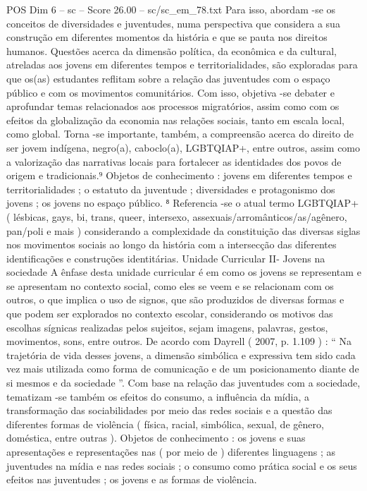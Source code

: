 \begin{textsample}{POS Dim 6 – sc – Score 26.00 – sc/sc\_em\_78.txt}
Para isso, abordam -se os conceitos de diversidades e juventudes, numa perspectiva que considera a sua construção em diferentes momentos da história e que se pauta nos direitos humanos.
Questões acerca da dimensão política, da econômica e da cultural, atreladas aos jovens em diferentes tempos e territorialidades, são exploradas para que os(as) estudantes reflitam sobre a relação das juventudes com o espaço público e com os movimentos comunitários.
Com isso, objetiva -se debater e aprofundar temas relacionados aos processos migratórios, assim como com os efeitos da globalização da economia nas relações sociais, tanto em escala local, como global.
Torna -se importante, também, a compreensão acerca do direito de ser jovem indígena, negro(a), caboclo(a), LGBTQIAP+, entre outros, assim como a valorização das narrativas locais para fortalecer as identidades dos povos de origem e tradicionais.⁹ Objetos de conhecimento : jovens em diferentes tempos e territorialidades ; o estatuto da juventude ; diversidades e protagonismo dos jovens ; os jovens no espaço público. ⁸ Referencia -se o atual termo LGBTQIAP+ ( lésbicas, gays, bi, trans, queer, intersexo, assexuais/arromânticos/as/agênero, pan/poli e mais ) considerando a complexidade da constituição das diversas siglas nos movimentos sociais ao longo da história com a intersecção das diferentes identificações e construções identitárias.
Unidade Curricular II- Jovens na sociedade A ênfase desta unidade curricular é em como os jovens se representam e se apresentam no contexto social, como eles se veem e se relacionam com os outros, o que implica o uso de signos, que são produzidos de diversas formas e que podem ser explorados no contexto escolar, considerando os motivos das escolhas sígnicas realizadas pelos sujeitos, sejam imagens, palavras, gestos, movimentos, sons, entre outros.
De acordo com Dayrell ( 2007, p. 1.109 ) : “ Na trajetória de vida desses jovens, a dimensão simbólica e expressiva tem sido cada vez mais utilizada como forma de comunicação e de um posicionamento diante de si mesmos e da sociedade ”.
Com base na relação das juventudes com a sociedade, tematizam -se também os efeitos do consumo, a influência da mídia, a transformação das sociabilidades por meio das redes sociais e a questão das diferentes formas de violência ( física, racial, simbólica, sexual, de gênero, doméstica, entre outras ).
Objetos de conhecimento : os jovens e suas apresentações e representações nas ( por meio de ) diferentes linguagens ; as juventudes na mídia e nas redes sociais ; o consumo como prática social e os seus efeitos nas juventudes ; os jovens e as formas de violência.

\end{textsample}
